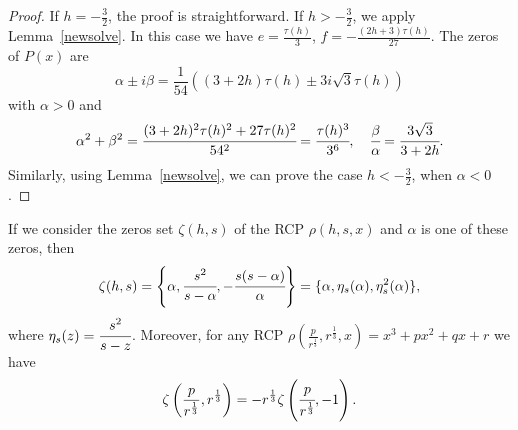 \documentclass[12pt,reqno]{article}
\begin{document}
\begin{proof}
If $h=-\frac{3}{2}$, the proof is straightforward.
If $h>-\frac{3}{2}$, we apply Lemma~\ref{newsolve}. In this case we have $e=\frac{\tau(h)}{3}$, $f=-\frac{(2h+3)\tau(h)}{27}$. The zeros of $P(x)$ are 
$$\alpha\pm i\beta=\frac{1}{54}((3+2h)\tau(h)\pm 3i\sqrt{3}\tau(h))$$
with $\alpha>0$ and
$$\alpha^2+\beta^2=\cfrac{(3+2h)^2\tau(h)^2+27\tau(h)^2}{54^2}=\cfrac{\tau(h)^3}{3^6},\quad \cfrac{\beta}{\alpha}=\cfrac{3\sqrt{3}}{3+2h} .$$
Similarly, using Lemma~\ref{newsolve}, we can prove the case $h<-\frac{3}{2}$, when $\alpha<0$.
\end{proof}
\begin{theorem} \label{root-rcp}
If we consider the zeros set $\zeta(h,s)$ of the RCP $\rho(h,s,x)$ and $\alpha$ is one of these zeros, then
\begin{equation}\label{eta}\zeta(h,s)=\left\{\alpha,\cfrac{s^2}{s-\alpha},-\cfrac{s(s-\alpha)}{\alpha}\right\}=\{\alpha,\eta_s(\alpha),\eta_s^2(\alpha)\},\end{equation}
where $\eta_s(z)=\cfrac{s^2}{s-z}$.
Moreover, for any RCP $\rho\left(\frac{p}{r^{\frac{1}{3}}},r^{\frac{1}{3}},x\right)=x^3+px^2+qx+r$  we have
\begin{equation}\label{zeta}\zeta\left(\frac{p}{r^{\frac{1}{3}}},r^{\frac{1}{3}}\right)=-r^{\frac{1}{3}}\zeta\left(\cfrac{p}{r^{\frac{1}{3}}},-1\right).\end{equation}
\end{theorem}
\end{document}
